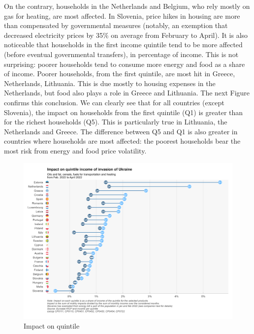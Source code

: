 \documentclass[
  9pt,
  a4paper,
  DIV=11,
  numbers=noendperiod]{scrartcl}
\begin{document}
On the contrary, households in the Netherlands and Belgium, who rely
mostly on gas for heating, are most affected. In Slovenia, price hikes
in housing are more than compensated by governmental measures (notably,
an exemption that decreased electricity prices by 35\% on average from
February to April). It is also noticeable that households in the first
income quintile tend to be more affected (before eventual governmental
transfers), in percentage of income. This is not surprising: poorer
households tend to consume more energy and food as a share of income.
Poorer households, from the first quintile, are most hit in Greece,
Netherlands, Lithuania. This is due mostly to housing expenses in the
Netherlands, but food also plays a role in Greece and Lithuania. The
next Figure confirms this conclusion. We can clearly see that for all
countries (except Slovenia), the impact on households from the first
quintile (Q1) is greater than for the richest households (Q5). This is
particularly true in Lithuania, the Netherlands and Greece. The
difference between Q5 and Q1 is also greater in countries where
households are most affected: the poorest households bear the most risk
from energy and food price volatility.

\begin{figure}

\caption{Impact on quintile}

{\centering \includegraphics[width=16cm,height=\textheight]{../svg/quantiles1et5.png}

}

\end{figure}
\end{document}
